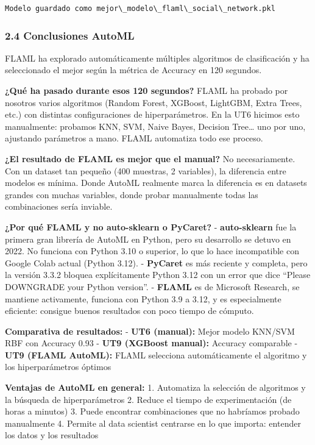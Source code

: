 \documentclass[11pt]{article}
\begin{document}
    \begin{Verbatim}[commandchars=\\\{\}]
Modelo guardado como mejor\_modelo\_flaml\_social\_network.pkl
    \end{Verbatim}

    \subsubsection{2.4 Conclusiones AutoML}\label{conclusiones-automl}

FLAML ha explorado automáticamente múltiples algoritmos de clasificación
y ha seleccionado el mejor según la métrica de Accuracy en 120 segundos.

\textbf{¿Qué ha pasado durante esos 120 segundos?} FLAML ha probado por
nosotros varios algoritmos (Random Forest, XGBoost, LightGBM, Extra
Trees, etc.) con distintas configuraciones de hiperparámetros. En la UT6
hicimos esto manualmente: probamos KNN, SVM, Naive Bayes, Decision
Tree\ldots{} uno por uno, ajustando parámetros a mano. FLAML automatiza
todo ese proceso.

\textbf{¿El resultado de FLAML es mejor que el manual?} No
necesariamente. Con un dataset tan pequeño (400 muestras, 2 variables),
la diferencia entre modelos es mínima. Donde AutoML realmente marca la
diferencia es en datasets grandes con muchas variables, donde probar
manualmente todas las combinaciones sería inviable.

\textbf{¿Por qué FLAML y no auto-sklearn o PyCaret?} -
\textbf{auto-sklearn} fue la primera gran librería de AutoML en Python,
pero su desarrollo se detuvo en 2022. No funciona con Python 3.10 o
superior, lo que lo hace incompatible con Google Colab actual (Python
3.12). - \textbf{PyCaret} es más reciente y completa, pero la versión
3.3.2 bloquea explícitamente Python 3.12 con un error que dice ``Please
DOWNGRADE your Python version''. - \textbf{FLAML} es de Microsoft
Research, se mantiene activamente, funciona con Python 3.9 a 3.12, y es
especialmente eficiente: consigue buenos resultados con poco tiempo de
cómputo.

\textbf{Comparativa de resultados:} - \textbf{UT6 (manual):} Mejor
modelo KNN/SVM RBF con Accuracy 0.93 - \textbf{UT9 (XGBoost manual):}
Accuracy comparable - \textbf{UT9 (FLAML AutoML):} FLAML selecciona
automáticamente el algoritmo y los hiperparámetros óptimos

\textbf{Ventajas de AutoML en general:} 1. Automatiza la selección de
algoritmos y la búsqueda de hiperparámetros 2. Reduce el tiempo de
experimentación (de horas a minutos) 3. Puede encontrar combinaciones
que no habríamos probado manualmente 4. Permite al data scientist
centrarse en lo que importa: entender los datos y los resultados
\end{document}
